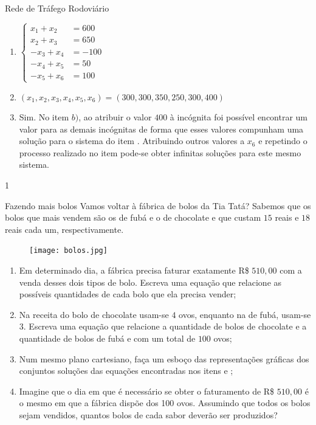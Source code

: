 \begin{answer}{Rede de Tráfego Rodoviário}
{
\begin{enumerate}
\item 
$\left \{
\begin{aligned}
x_1+x_2&=600\\
x_2+x_3&=650\\
-x_3+x_4&=-100\\
-x_4+x_5&=50\\
-x_5+x_6&=100
\end{aligned}
\right.$
\item $(x_1,x_2,x_3,x_4,x_5,x_6)=(300,300,350,250,300,400)$
\item Sim. No item $b)$, ao atribuir o valor $400$ à incógnita  foi possível encontrar um valor para as demais incógnitas de forma que esses valores compunham uma solução para o sistema do item . Atribuindo outros valores a $x_6$ e repetindo o processo realizado no item  pode-se obter infinitas soluções para este mesmo sistema.
\end{enumerate}
}{1}
\end{answer}

\label{\detokenize{AF107-5:explorando-sistemas-lineares}}\label{\detokenize{AF107-5::doc}}

\begin{task}{Fazendo mais bolos}
\label{mais_bolos}
Vamos voltar à fábrica de bolos da Tia Tatá? Sabemos que os bolos que mais vendem são os de fubá e o de chocolate e que custam $15$ reais e $18$ reais cada um, respectivamente.

\begin{figure}[H]
\centering

\noindent\texttt{[image: bolos.jpg]}
\end{figure}

\begin{enumerate}
\item{}
Em determinado dia, a fábrica precisa faturar exatamente R\$ $510{,}00$ com a venda desses dois tipos de bolo. Escreva uma equação que relacione as possíveis quantidades de cada bolo que ela precisa vender;

\item{}
Na receita do bolo de chocolate usam-se $4$ ovos, enquanto na de fubá, usam-se $3$. Escreva uma equação que relacione a quantidade de bolos de chocolate e a quantidade de bolos de fubá e com um total de $100$ ovos;

\item{}
Num mesmo plano cartesiano, faça um esboço das representações gráficas dos conjuntos soluções das equações encontradas nos itens  e ;

\item{}
Imagine que o dia em que é necessário se obter o faturamento de R\$ $510{,}00$ é o mesmo em que a fábrica dispõe dos 100 ovos. Assumindo que todos os bolos sejam vendidos, quantos bolos de cada sabor deverão ser produzidos?
\end{enumerate}



\end{task}



